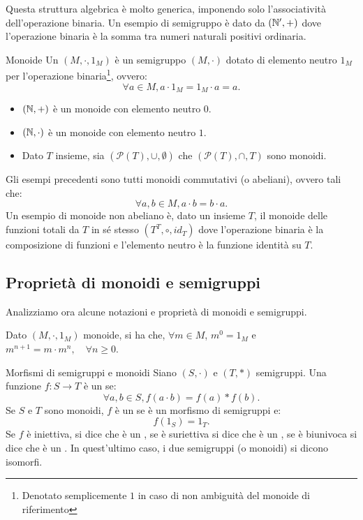 Questa struttura algebrica è molto generica, imponendo solo l'associatività dell'operazione binaria.
Un esempio di semigruppo è dato da \((\mathbb{N}',+)\) dove l'operazione binaria è la somma tra numeri naturali positivi ordinaria.

\begin{definition}{Monoide}
  Un  \((M,\cdot,1_M)\) è un semigruppo \((M, \cdot)\) dotato di elemento neutro \(1_M\) per l'operazione binaria\footnote{Denotato semplicemente \(1\) in caso di non ambiguità del monoide di riferimento}, ovvero:
  \[\forall a \in M, a \cdot 1_M = 1_M \cdot a = a.\]
\end{definition}

\begin{example}{}
  \begin{itemize}
    \item \((\mathbb{N}, +)\) è un monoide con elemento neutro \(0\).
    \item \((\mathbb{N}, \cdot)\) è un monoide con elemento neutro \(1\).
    \item Dato \(T\) insieme, sia \((\mathcal{P}(T), \cup, \emptyset)\) che \((\mathcal{P}(T), \cap, T)\) sono monoidi.
  \end{itemize}
  Gli esempi precedenti sono tutti monoidi commutativi (o abeliani), ovvero tali che:
  \[\forall a,b \in M, a \cdot b = b \cdot a.\]
  Un esempio di monoide non abeliano è, dato un insieme \(T\), il monoide delle funzioni totali da \(T\) in sé stesso \((T^{T}, \circ, id_T)\) dove l'operazione binaria è la composizione di funzioni e l'elemento neutro è la funzione identità su \(T\).
\end{example}

\subsection{Proprietà di monoidi e semigruppi}

Analizziamo ora alcune notazioni e proprietà di monoidi e semigruppi.

\begin{definition}[label=obs:power_notation]{}
  Dato \((M,\cdot,1_M)\) monoide, si ha che, \(\forall m \in M\), \(m^0 = 1_M\) e \(m^{n+1} = m \cdot m^n, \quad \forall n \geq 0\).
\end{definition}

\begin{definition}{Morfismi di semigruppi e monoidi}
  Siano \((S,\cdot)\) e \((T,*)\) semigruppi.
  Una funzione \(f: S \to T\) è un  se:
  \[\forall a,b \in S, f(a \cdot b) = f(a) * f(b).\]
  Se \(S\) e \(T\) sono monoidi, \(f\) è un  se è un morfismo di semigruppi e:
  \[f(1_S) = 1_T.\]
  Se \(f\) è iniettiva, si dice che è un , se è suriettiva si dice che è un , se è biunivoca si dice che è un .
  In quest'ultimo caso, i due semigruppi (o monoidi) si dicono isomorfi.
\end{definition}

